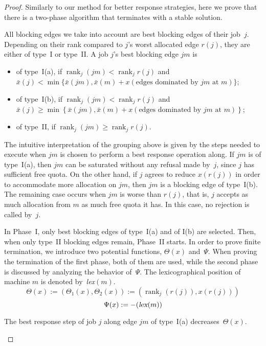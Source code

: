 \documentclass{llncs}
\newcommand{\lex}{{\slshape lex}}
\DeclareMathOperator{\rank}{rank}
\begin{document}
\begin{proof}

	Similarly to our method for better response strategies, here we prove that there is a two-phase algorithm that terminates with a stable solution. 
	
	All blocking edges we take into account are best blocking edges of their job~$j$. Depending on their rank compared to $j$'s worst allocated edge $r(j)$, they are either of type~I or type~II. A job $j$'s best blocking edge $jm$ is \begin{itemize}
	\item of type~I(a), if $\rank_j(jm) < \rank_j r(j)$ and \\ $\bar{x}(j) < \min{\{\bar{x}(jm), \bar{x}(m) + x(\text{edges dominated by $jm$ at $m$})\}}$;
	\item of type~I(b), if $\rank_j(jm) < \rank_j r(j)$ and \\ $\bar{x}(j) \geq \min{\left\{\bar{x}(jm), \bar{x}(m) + x(\text{edges dominated by $jm$ at $m$})\right\}}$;
	\item of type~II, if $\rank_j(jm) \geq \rank_j r(j)$.
	\end{itemize}
	The intuitive interpretation of the grouping above is given by the steps needed to execute when $jm$ is chosen to perform a best response operation along. If $jm$ is of type~I(a), then $jm$ can be saturated without any refusal made by~$j$, since $j$ has sufficient free quota. On the other hand, if $j$ agrees to reduce $x(r(j))$ in order to accommodate more allocation on $jm$, then $jm$ is a blocking edge of type~I(b). The remaining case occurs when $jm$ is worse than $r(j)$, that is, $j$ accepts as much allocation from $m$ as much free quota it has. In this case, no rejection is called by~$j$.
	
	In Phase~I, only best blocking edges of type~I(a) and of I(b) are selected. Then, when only type~II blocking edges remain, Phase~II starts. In order to prove finite termination, we introduce two potential functions, $\Theta(x)$ and~$\Psi$. When proving the termination of the first phase, both of them are used, while the second phase is discussed by analyzing the behavior of~$\Psi$. The lexicographical position of machine $m$ is denoted by~\lex$(m)$.
	$$\Theta(x) := (\Theta_{1}(x), \Theta_{2}(x)) := (\rank_j(r(j)), x(r(j)))$$ $$\Psi(x) := - (\text{\lex}(m))$$
	
	\begin{claim}The best response step of job $j$ along edge $jm$ of type~I(a) decreases~$\Theta(x)$.
	\end{claim}
	

\end{proof}
\end{document}
